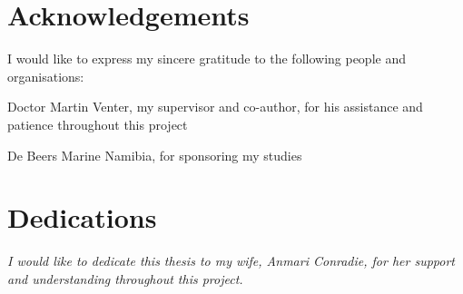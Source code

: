 \begin{abstract}[english]%

\end{abstract}





\chapter{Acknowledgements}%

I would like to express my sincere gratitude to the following people and organisations:

Doctor Martin Venter, my supervisor and co-author, for his assistance and patience throughout this project

De Beers Marine Namibia, for sponsoring my studies



\chapter{Dedications}%
 \vfill
 \begin{center}\itshape
 	I would like to dedicate this thesis to my wife, Anmari Conradie, for her support and understanding throughout this project.
 \end{center}
 \vfill
 \clearpage

\endinput
